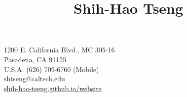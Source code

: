 \title{Shih-Hao Tseng}{
1200 E. California Blvd., MC 305-16\\
Pasadena, CA 91125\\%
U.S.A.
}{
(626) 709-6760 (Mobile)\\
shtseng@caltech.edu\\ %
\href{http://shih-hao-tseng.github.io/website}{shih-hao-tseng.github.io/website}%
}